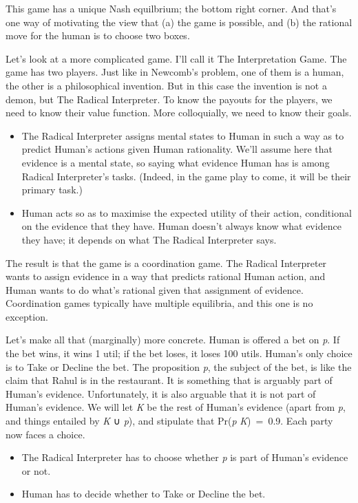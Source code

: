 \documentclass[
  11pt,
]{book}
\providecommand{\tightlist}{%
  \setlength{\itemsep}{0pt}\setlength{\parskip}{0pt}}
\begin{document}
This game has a unique Nash equilbrium; the bottom right corner. And that's one way of motivating the view that (a) the game is possible, and (b) the rational move for the human is to choose two boxes.

Let's look at a more complicated game. I'll call it The Interpretation Game. The game has two players. Just like in Newcomb's problem, one of them is a human, the other is a philosophical invention. But in this case the invention is not a demon, but The Radical Interpreter. To know the payouts for the players, we need to know their value function. More colloquially, we need to know their goals.

\begin{itemize}
\tightlist
\item
  The Radical Interpreter assigns mental states to Human in such a way as to predict Human's actions given Human rationality. We'll assume here that evidence is a mental state, so saying what evidence Human has is among Radical Interpreter's tasks. (Indeed, in the game play to come, it will be their primary task.)
\item
  Human acts so as to maximise the expected utility of their action, conditional on the evidence that they have. Human doesn't always know what evidence they have; it depends on what The Radical Interpreter says.
\end{itemize}

The result is that the game is a coordination game. The Radical Interpreter wants to assign evidence in a way that predicts rational Human action, and Human wants to do what's rational given that assignment of evidence. Coordination games typically have multiple equilibria, and this one is no exception.

Let's make all that (marginally) more concrete. Human is offered a bet on \emph{p}. If the bet wins, it wins 1 util; if the bet loses, it loses 100 utils. Human's only choice is to Take or Decline the bet. The proposition \emph{p}, the subject of the bet, is like the claim that Rahul is in the restaurant. It is something that is arguably part of Human's evidence. Unfortunately, it is also arguable that it is not part of Human's evidence. We will let \emph{K} be the rest of Human's evidence (apart from \emph{p}, and things entailed by \emph{K} ∪ \emph{p}), and stipulate that Pr(\emph{p} \textbar{} \emph{K})~=~0.9. Each party now faces a choice.

\begin{itemize}
\tightlist
\item
  The Radical Interpreter has to choose whether \emph{p} is part of Human's evidence or not.
\item
  Human has to decide whether to Take or Decline the bet.
\end{itemize}
\end{document}
